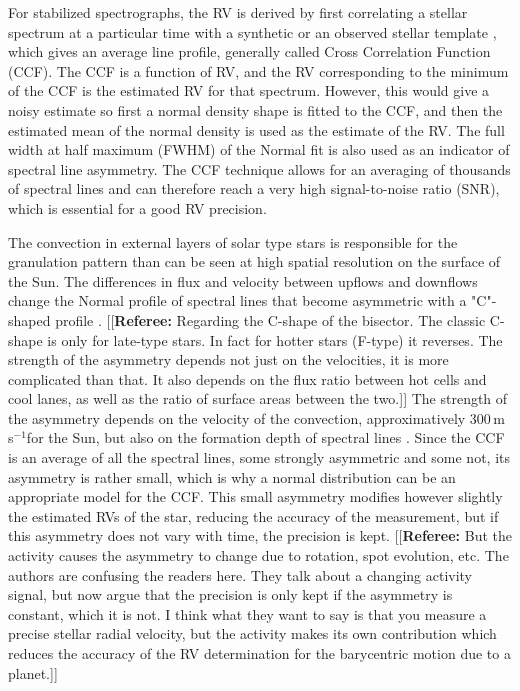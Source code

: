 \documentclass[11pt, oneside]{article}
\def\ms{\hbox{\,m\,s$^{-1}$}}         %
\newcommand{\comment}[1]{{\color{red}[[\textbf{Referee: }#1]]}}
\begin{document}
For stabilized spectrographs, the RV is derived by first correlating a stellar spectrum at a particular time with a synthetic \citep[][]{Baranne-1996,Pepe-2002a} or an observed stellar template \citep[][]{Anglada-Escude-2012}, which gives an average line profile, generally called Cross Correlation Function (CCF).  The CCF is a function of RV, and the RV corresponding to the minimum of the CCF is the estimated RV for that spectrum.  However, this would give a noisy estimate so first a normal density shape is fitted to the CCF, and then the estimated mean of the normal density is used as the estimate of the RV.  The full width at half maximum (FWHM) of the Normal fit is also used as an indicator of spectral line asymmetry.
The CCF technique allows for an averaging of thousands of spectral lines and can therefore reach a very high signal-to-noise ratio (SNR), which is essential for a good RV precision.

The convection in external layers of solar type stars is responsible for the granulation pattern than can be seen at high spatial resolution on the surface of the Sun. The differences in flux and velocity between upflows and downflows change the Normal profile of spectral lines that become asymmetric with a "C"-shaped profile \citep[][]{Dravins-1981}. 
\comment{Regarding the C-shape of the bisector. The classic C-shape is only for late-type stars. In fact for hotter stars (F-type) it reverses.
The strength of the asymmetry depends not just on the velocities, it is more complicated than that. It also depends on the flux ratio between hot cells and cool lanes, as well as the ratio of surface areas between the two.}
The strength of the asymmetry depends on the velocity of the convection, approximatively 300\ms for the Sun, but also on the formation depth of spectral lines \citep{Gray-2009}. Since the CCF is an average of all the spectral lines, some strongly asymmetric and some not, its asymmetry is rather small, which is why a normal distribution can be an appropriate model for the CCF. This small asymmetry modifies however slightly the estimated RVs of the star, reducing the accuracy of the measurement, but if this asymmetry does not vary with time, the precision is kept.
\comment{But the activity causes the asymmetry to change due to rotation, spot evolution, etc. The authors are confusing the readers here. They talk about a changing activity signal, but now argue that the precision is only kept if the asymmetry is constant, which it is not. I think what they want to say is that you measure a precise stellar radial velocity, but the activity makes its own contribution which reduces the accuracy of the RV determination for the barycentric motion due to a planet.}
\end{document}
